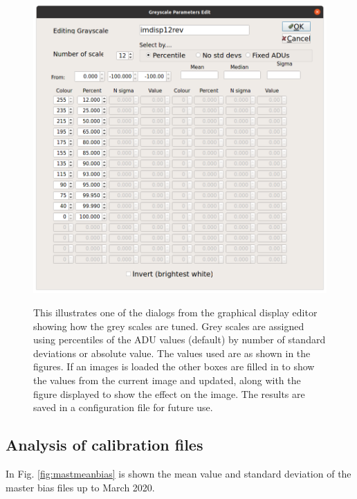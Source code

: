 \begin{figure}[!htbp]
\begin{center}
\includegraphics[scale=0.4]{images/geditorshot.png}
\end{center}   
\caption{This illustrates one of the dialogs from the graphical display editor
showing how the grey scales are tuned. Grey scales are assigned using
percentiles of the ADU values (default) by number of standard deviations or
absolute value. The values used are as shown in the figures. If an images is
loaded the other boxes are filled in to show the values from the current image
and updated, along with the figure displayed to show the effect on the image.
The results are saved in a configuration file for future use.}
\protect\label{fig:geditorshot}
\end{figure}

\subsection{Analysis of calibration files}
\protect\label{section:masterbiasflag}

In Fig. \ref{fig:mastmeanbias} is shown the mean value and standard deviation of
the master bias files up to March 2020.

